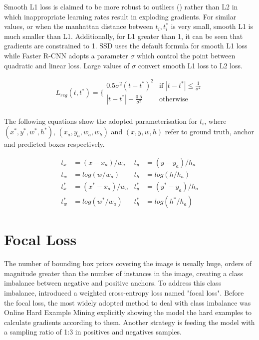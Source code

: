Smooth L1 loss is claimed to be more robust to outliers (\cite{ren2015faster}) rather than L2 in which inappropriate learning rates result in exploding gradients. For similar values, or when the manhattan distance between $t_i, t_i^*$ is very small, smooth L1 is much smaller than L1. Additionally, for L1 greater than 1, it can be seen that gradients are constrained to 1. SSD uses the default formula for smooth L1 loss while Faster R-CNN adopts a parameter $\sigma$ which control the point between quadratic and linear loss. Large values of $\sigma$ convert smooth L1 loss to L2 loss.

\begin{equation}
    L_{reg}(t,t^*)= \bigg\{
    \begin{array}{ll}
      0.5\sigma^2(t-t^*)^2 & \text{if } |t-t^*|\leq \frac{1}{\sigma^2} \\
      |t-t^*|-\frac{0.5}{\sigma^2} &  \text{otherwise} \\
    \end{array}
\end{equation}

The following equations show the adopted parameterisation for $t_i$, where $(x^*,y^*,w^*,h^*)$, $(x_a,y_a,w_a,w_h)$ and $(x,y,w,h)$ refer to ground truth, anchor and predicted boxes respectively. 

\begin{align}
t_x		&= (x-x_a)/w_a			&		t_y	&= (y-y_a)/h_a \\
t_w		&= log(w/w_a)			&		t_h 	&= log(h/h_a) \\
t_x^*		&= (x^*-x_a)/w_a		&		t_y^*	&= (y^*-y_a)/h_a \\
t_w^*	&= log(w^*/w_a)		&		t_h^*	&= log(h^*/h_a) 
\end{align}

\section{Focal Loss}
The number of bounding box priors covering the image is usually huge, orders of magnitude greater than the number of instances in the image, creating a class imbalance between negative and positive anchors. To address this class imbalance, \cite{lin2017focal} introduced a weighted cross-entropy loss named "focal loss". Before the focal loss, the most widely adopted method to deal with class imbalance was Online Hard Example Mining explicitly showing the model the hard examples to calculate gradients according to them. Another strategy is feeding the model with a sampling ratio of 1:3 in positives and negatives samples.

